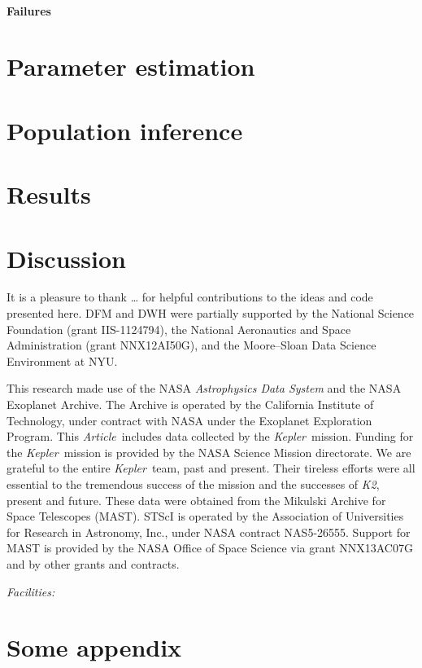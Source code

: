 \documentclass[12pt,preprint]{aastex}
\newcommand{\project}[1]{\textsl{#1}}
\newcommand{\kepler}{\project{Kepler}}
\newcommand{\KT}{\project{K2}}
\newcommand{\paper}{\textsl{Article}}
\newcommand{\figlabel}[1]{\label{fig:#1}}
\begin{document}
\paragraph{Failures}


\section{Parameter estimation}


\section{Population inference}


\section{Results}


\section{Discussion}


\acknowledgments
It is a pleasure to thank
\ldots
for helpful contributions to the ideas and code presented here.
DFM and DWH were partially supported by the National Science Foundation
(grant IIS-1124794),
the National Aeronautics and Space Administration
(grant NNX12AI50G), and the Moore--Sloan Data Science Environment at NYU.

This research made use of the NASA \project{Astrophysics Data System} and the
NASA Exoplanet Archive.
The Archive is operated by the California Institute of Technology, under
contract with NASA under the Exoplanet Exploration Program.
This \paper\ includes data collected by the \kepler\ mission. Funding for the
\kepler\ mission is provided by the NASA Science Mission directorate.
We are grateful to the entire \kepler\ team, past and present.
Their tireless efforts were all essential to the tremendous success of the mission
and the successes of \KT, present and future.
These data were obtained from the Mikulski Archive for Space Telescopes
(MAST).
STScI is operated by the Association of Universities for Research in
Astronomy, Inc., under NASA contract NAS5-26555.
Support for MAST is provided by the NASA Office of Space Science via grant
NNX13AC07G and by other grants and contracts.

{\it Facilities:} 

\appendix

\section{Some appendix}

\clearpage

\clearpage


\end{document}
